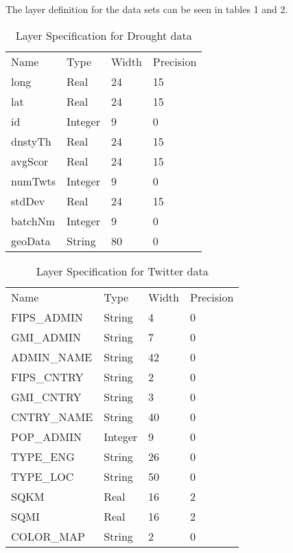 \documentclass[conference]{IEEEtran}
\begin{document}
The layer definition for the data sets can be seen in tables 1 and 2.

\begin{table}[]
\caption{Layer Specification for Drought data}
\label{Table 1}
\centering
\begin{tabular}{llll}
Name    & Type    & Width & Precision \\
long    & Real    & 24    & 15        \\
lat     & Real    & 24    & 15        \\
id      & Integer & 9     & 0         \\
dnstyTh & Real    & 24    & 15        \\
avgScor & Real    & 24    & 15        \\
numTwts & Integer & 9     & 0         \\
stdDev  & Real    & 24    & 15        \\
batchNm & Integer & 9     & 0         \\
geoData & String  & 80    & 0        
\end{tabular}
\end{table}

\begin{table}[]
\caption{Layer Specification for Twitter data}
\label{Table 2}
\centering
\begin{tabular}{llll}
Name        & Type    & Width & Precision \\
FIPS\_ADMIN & String  & 4     & 0         \\
GMI\_ADMIN  & String  & 7     & 0         \\
ADMIN\_NAME & String  & 42    & 0         \\
FIPS\_CNTRY & String  & 2     & 0         \\
GMI\_CNTRY  & String  & 3     & 0         \\
CNTRY\_NAME & String  & 40    & 0         \\
POP\_ADMIN  & Integer & 9     & 0         \\
TYPE\_ENG   & String  & 26    & 0         \\
TYPE\_LOC   & String  & 50    & 0         \\
SQKM        & Real    & 16    & 2         \\
SQMI        & Real    & 16    & 2         \\
COLOR\_MAP  & String  & 2     & 0        
\end{tabular}
\end{table}
\end{document}
